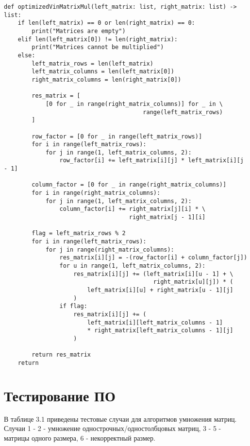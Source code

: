 \begin{lstlisting}[label=multVinOptimize, caption=Алгоритм умножения матриц Винограда (оптимизированный)]
def optimizedVinMatrixMul(left_matrix: list, right_matrix: list) -> list:
    if len(left_matrix) == 0 or len(right_matrix) == 0:
        print("Matrices are empty")
    elif len(left_matrix[0]) != len(right_matrix):
        print("Matrices cannot be multiplied")
    else:
        left_matrix_rows = len(left_matrix)
        left_matrix_columns = len(left_matrix[0])
        right_matrix_columns = len(right_matrix[0])

        res_matrix = [
            [0 for _ in range(right_matrix_columns)] for _ in \
                                        range(left_matrix_rows)
        ]

        row_factor = [0 for _ in range(left_matrix_rows)]
        for i in range(left_matrix_rows):
            for j in range(1, left_matrix_columns, 2):
                row_factor[i] += left_matrix[i][j] * left_matrix[i][j - 1]

        column_factor = [0 for _ in range(right_matrix_columns)]
        for i in range(right_matrix_columns):
            for j in range(1, left_matrix_columns, 2):
                column_factor[i] += right_matrix[j][i] * \
                                    right_matrix[j - 1][i]

        flag = left_matrix_rows % 2
        for i in range(left_matrix_rows):
            for j in range(right_matrix_columns):
                res_matrix[i][j] = -(row_factor[i] + column_factor[j])
                for u in range(1, left_matrix_columns, 2):
                    res_matrix[i][j] += (left_matrix[i][u - 1] + \
                                           right_matrix[u][j]) * (
                        left_matrix[i][u] + right_matrix[u - 1][j]
                    )
                if flag:
                    res_matrix[i][j] += (
                        left_matrix[i][left_matrix_columns - 1]
                        * right_matrix[left_matrix_columns - 1][j]
                    )

        return res_matrix
    return
\end{lstlisting}
\captionsetup{singlelinecheck = false, justification=centering}

\section{Тестирование ПО}

В таблице 3.1 приведены тестовые случаи для алгоритмов умножения матриц. Случаи 1 - 2 - умножение однострочных/одностолбцовых матриц, 3 - 5 - матрицы одного размера, 6 - некорректный размер.

